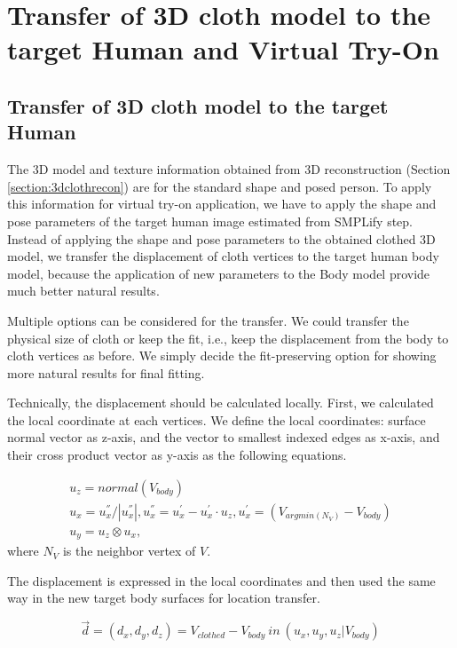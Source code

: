 \section{Transfer of 3D cloth model to the target Human and Virtual Try-On }  \label{section:clothtransfer}


\subsection{Transfer of 3D cloth model to the target Human} 

The 3D model and texture information obtained from 3D reconstruction (Section \ref{section:3dclothrecon}) are for the standard shape and posed person. To apply this information for virtual try-on application, we have to apply the shape and pose parameters of the target human image estimated from SMPLify\cite{Bogo2016SMPLify} step.  Instead of applying the shape and pose parameters to the obtained clothed 3D model, we transfer the displacement of cloth vertices to the target human body model, because the application of new parameters to the Body model provide much better natural results.      


Multiple options can be considered for the transfer. We could transfer the physical size of cloth or keep the fit, i.e., keep the displacement from the body to cloth vertices as before.  We simply decide the fit-preserving option for showing more natural results for final fitting.  

Technically, the displacement should be calculated locally. First, we calculated the local coordinate at each vertices. We define the local coordinates: surface normal vector as z-axis, and the vector to smallest indexed edges as x-axis, and their cross product vector as y-axis as the following equations.


\begin{align}
 u_{z} =  normal(V_{body})  \\
 u_{x} = u^{''}_{x}/ |u^{''}_{x} |, 
 u^{''}_{x} = u^{'}_{x} - u^{'}_{x} \cdot u_{z}, 
 u^{'}_{x} = (V_{argmin(N_V) } - V_{body}) \\
 u_{y}  =  u_z \otimes u_x,
\end{align} 
 where $N_V$ is the neighbor vertex of $V$.
 

The displacement is expressed in the local coordinates and then used the same way in the new target body surfaces for location transfer.

\begin{equation}
\overrightarrow{d} = (d_x, d_y, d_z) = V_{clothed} - V_{body} \: in \: (u_x, u_y, u_z | V_{body})
\end{equation}


